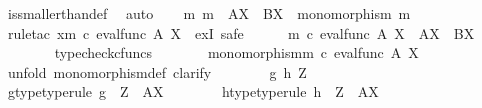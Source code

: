 \begin{isabellebody}
\ is{\isacharunderscore}{\kern0pt}smaller{\isacharunderscore}{\kern0pt}than{\isacharunderscore}{\kern0pt}def\ \isamarkupfalse%
\ auto\isanewline
\ \ \isamarkupfalse%
\ {\isachardoublequoteopen}{\isasymexists}m{\isachardot}{\kern0pt}\ m\ {\isacharcolon}{\kern0pt}\ A\isactrlbsup X\isactrlesup \ {\isasymrightarrow}\ B\isactrlbsup X\isactrlesup \ {\isasymand}\ monomorphism\ m{\isachardoublequoteclose}\isanewline
\ \ \isamarkupfalse%
\ {\isacharparenleft}{\kern0pt}rule{\isacharunderscore}{\kern0pt}tac\ x{\isacharequal}{\kern0pt}{\isachardoublequoteopen}{\isacharparenleft}{\kern0pt}m\ {\isasymcirc}\isactrlsub c\ eval{\isacharunderscore}{\kern0pt}func\ A\ X{\isacharparenright}{\kern0pt}\isactrlsup {\isasymsharp}{\isachardoublequoteclose}\ \ exI{\isacharcomma}{\kern0pt}\ safe{\isacharparenright}{\kern0pt}\isanewline
\ \ \ \ \isamarkupfalse%
\ {\isachardoublequoteopen}{\isacharparenleft}{\kern0pt}m\ {\isasymcirc}\isactrlsub c\ eval{\isacharunderscore}{\kern0pt}func\ A\ X{\isacharparenright}{\kern0pt}\isactrlsup {\isasymsharp}\ {\isacharcolon}{\kern0pt}\ A\isactrlbsup X\isactrlesup \ {\isasymrightarrow}\ B\isactrlbsup X\isactrlesup {\isachardoublequoteclose}\isanewline
\ \ \ \ \ \ \isamarkupfalse%
\ typecheck{\isacharunderscore}{\kern0pt}cfuncs\isanewline
\ \ \ \ \isamarkupfalse%
\ \isamarkupfalse%
\ {\isachardoublequoteopen}monomorphism{\isacharparenleft}{\kern0pt}{\isacharparenleft}{\kern0pt}m\ {\isasymcirc}\isactrlsub c\ eval{\isacharunderscore}{\kern0pt}func\ A\ X{\isacharparenright}{\kern0pt}\isactrlsup {\isasymsharp}{\isacharparenright}{\kern0pt}{\isachardoublequoteclose}\isanewline
\ \ \ \ \isamarkupfalse%
\ {\isacharparenleft}{\kern0pt}unfold\ monomorphism{\isacharunderscore}{\kern0pt}def{}{\isacharcomma}{\kern0pt}\ clarify{\isacharparenright}{\kern0pt}\isanewline
\ \ \ \ \ \ \isamarkupfalse%
\ g\ h\ Z\isanewline
\ \ \ \ \ \ \isamarkupfalse%
\ g{\isacharunderscore}{\kern0pt}type{\isacharbrackleft}{\kern0pt}type{\isacharunderscore}{\kern0pt}rule{\isacharbrackright}{\kern0pt}{\isacharcolon}{\kern0pt}\ {\isachardoublequoteopen}g\ {\isacharcolon}{\kern0pt}\ Z\ {\isasymrightarrow}\ A\isactrlbsup X\isactrlesup {\isachardoublequoteclose}\isanewline
\ \ \ \ \ \ \isamarkupfalse%
\ h{\isacharunderscore}{\kern0pt}type{\isacharbrackleft}{\kern0pt}type{\isacharunderscore}{\kern0pt}rule{\isacharbrackright}{\kern0pt}{\isacharcolon}{\kern0pt}\ {\isachardoublequoteopen}h\ {\isacharcolon}{\kern0pt}\ Z\ {\isasymrightarrow}\ A\isactrlbsup X\isactrlesup {\isachardoublequoteclose}\isanewline

\end{isabellebody}
